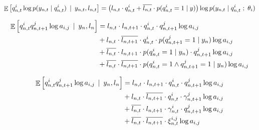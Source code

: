 \documentclass[a4paper, 11pt]{article}
\newcommand{\conde}[2]{\mathop{\mathbb{E}}\left[#1 \hspace{.2em}\mid\hspace{.2em} #2 \right]}
\newcommand{\ssemi}{\hspace{.3em};\hspace{.3em}}
\begin{document}

\begin{displaymath}
  \conde{q_{n, t}^i \log{ p(y_{n, t} \mid q_{n, t}^i)}}{y_{n, t}, l_{n, t}} =
  \left(
    l_{n, t} \cdot q_{n, t}^i + \overline{l_{n, t}} \cdot p(q_{n, t}^i = 1 \mid y)
  \right)
  \log{ p(y_{n, t} \mid q_{n, t}^i \ssemi \theta_i)}
\end{displaymath}

\begin{displaymath}
  \begin{split}
    \conde{ q_{n, t}^i q_{n, t+1}^j \log{a_{i,j}}}{y_{n}, l_{n}}
    & = l_{n, t} \cdot l_{n, t+1} \cdot q_{n, t}^i \cdot q_{n, t+1}^j \log{a_{i, j}}\\
    & + l_{n, t} \cdot \overline{l_{n, t+1}} \cdot q_{n, t}^i \cdot p(q_{n, t+1}^j = 1 \mid y_{n}) \log{a_{i, j}} \\
    & + \overline{l_{n, t}} \cdot l_{n, t+1} \cdot p(q_{n, t}^i = 1 \mid y_{n}) \cdot q_{n, t + 1}^j \log{a_{i, j}} \\
    & + \overline{l_{n, t}} \cdot \overline{l_{n, t+1}} \cdot p(q_{n, t}^i = 1 \wedge q_{n, t + 1}^j = 1  \mid y_{n}) \log{a_{i, j}} \\
  \end{split}
\end{displaymath}

\begin{displaymath}
  \begin{split}
    \conde{ q_{n, t}^i q_{n, t+1}^j \log{a_{i,j}}}{y_{n}, l_{n}}
    & = l_{n, t} \cdot l_{n, t+1} \cdot q_{n, t}^i \cdot q_{n, t+1}^j \log{a_{i, j}}\\
    & + l_{n, t} \cdot \overline{l_{n, t+1}} \cdot q_{n, t}^i \cdot \gamma_{n, t+1}^j \log{a_{i, j}} \\
    & + \overline{l_{n, t}} \cdot l_{n, t+1} \cdot \gamma_{n, t}^i \cdot q_{n, t + 1}^j \log{a_{i, j}} \\
    & + \overline{l_{n, t}} \cdot \overline{l_{n, t+1}} \cdot \xi_{n, t}^{i,j} \log{a_{i, j}} \\
  \end{split}
\end{displaymath}
\end{document}

